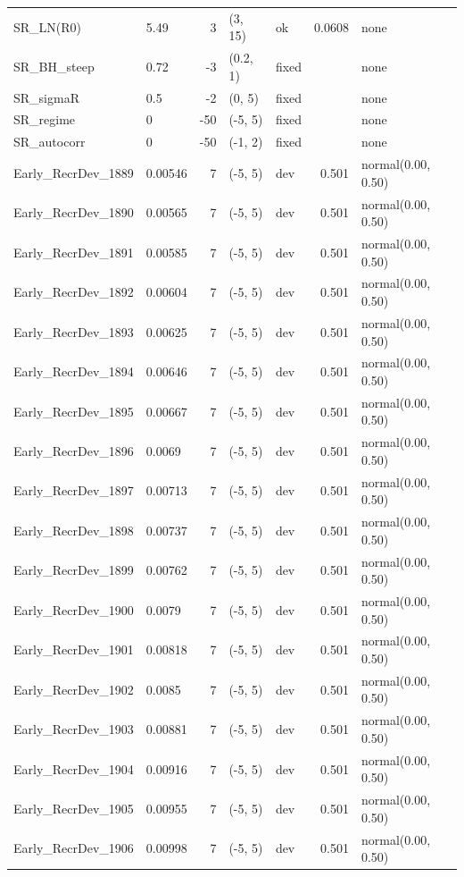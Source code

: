 \documentclass[
]{scrartcl}
\begin{document}
\begin{landscape}
\begin{longtable}{llrllrl}
SR\_LN(R0) & 5.49 & 3 & (3, 15) & ok & 0.0608 & none \\ 
SR\_BH\_steep & 0.72 & -3 & (0.2, 1) & fixed &  & none \\ 
SR\_sigmaR & 0.5 & -2 & (0, 5) & fixed &  & none \\ 
SR\_regime & 0 & -50 & (-5, 5) & fixed &  & none \\ 
SR\_autocorr & 0 & -50 & (-1, 2) & fixed &  & none \\ 
Early\_RecrDev\_1889 & 0.00546 & 7 & (-5, 5) & dev & 0.501 & normal(0.00, 0.50) \\ 
Early\_RecrDev\_1890 & 0.00565 & 7 & (-5, 5) & dev & 0.501 & normal(0.00, 0.50) \\ 
Early\_RecrDev\_1891 & 0.00585 & 7 & (-5, 5) & dev & 0.501 & normal(0.00, 0.50) \\ 
Early\_RecrDev\_1892 & 0.00604 & 7 & (-5, 5) & dev & 0.501 & normal(0.00, 0.50) \\ 
Early\_RecrDev\_1893 & 0.00625 & 7 & (-5, 5) & dev & 0.501 & normal(0.00, 0.50) \\ 
Early\_RecrDev\_1894 & 0.00646 & 7 & (-5, 5) & dev & 0.501 & normal(0.00, 0.50) \\ 
Early\_RecrDev\_1895 & 0.00667 & 7 & (-5, 5) & dev & 0.501 & normal(0.00, 0.50) \\ 
Early\_RecrDev\_1896 & 0.0069 & 7 & (-5, 5) & dev & 0.501 & normal(0.00, 0.50) \\ 
Early\_RecrDev\_1897 & 0.00713 & 7 & (-5, 5) & dev & 0.501 & normal(0.00, 0.50) \\ 
Early\_RecrDev\_1898 & 0.00737 & 7 & (-5, 5) & dev & 0.501 & normal(0.00, 0.50) \\ 
Early\_RecrDev\_1899 & 0.00762 & 7 & (-5, 5) & dev & 0.501 & normal(0.00, 0.50) \\ 
Early\_RecrDev\_1900 & 0.0079 & 7 & (-5, 5) & dev & 0.501 & normal(0.00, 0.50) \\ 
Early\_RecrDev\_1901 & 0.00818 & 7 & (-5, 5) & dev & 0.501 & normal(0.00, 0.50) \\ 
Early\_RecrDev\_1902 & 0.0085 & 7 & (-5, 5) & dev & 0.501 & normal(0.00, 0.50) \\ 
Early\_RecrDev\_1903 & 0.00881 & 7 & (-5, 5) & dev & 0.501 & normal(0.00, 0.50) \\ 
Early\_RecrDev\_1904 & 0.00916 & 7 & (-5, 5) & dev & 0.501 & normal(0.00, 0.50) \\ 
Early\_RecrDev\_1905 & 0.00955 & 7 & (-5, 5) & dev & 0.501 & normal(0.00, 0.50) \\ 
Early\_RecrDev\_1906 & 0.00998 & 7 & (-5, 5) & dev & 0.501 & normal(0.00, 0.50) \\ 

\end{longtable}
\end{landscape}
\end{document}
